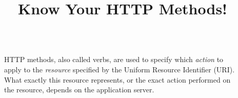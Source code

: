 \documentclass[final]{beamer}
\title{\Large Know Your HTTP Methods!}
\begin{document}
  \begin{frame}{}
    \begin{minipage}{\textwidth}
      \centering
    \end{minipage}
    
    \vspace{0.5in}

    \begin{columns}
      \begin{column}{0.1\textwidth}
      \end{column}
      \begin{column}{0.8\textwidth}
        \begin{block}{}
          \huge
            HTTP methods, also called verbs, are used to specify which \emph{action}
            to apply to the  \emph{resource} specified by the Uniform Resource
            Identifier (URI). What exactly this resource represents, or the exact
            action performed on the resource, depends on the application server.
          \normalsize
        \end{block}
      \end{column}
      \begin{column}{0.1\textwidth}
      \end{column}
    \end{columns}

    \vspace{0.5in}


\end{frame}
\end{document}
